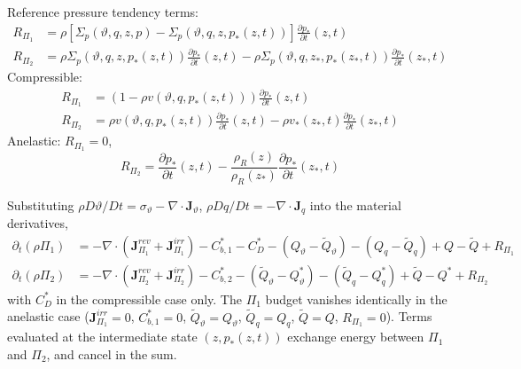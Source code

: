 \documentclass{article}
\begin{document}
Reference pressure tendency terms:
\begin{align}
    R_{\Pi_1}
    & =
    \rho
    \left[
        \Sigma_p(\vartheta, q, z, p)
        - \Sigma_p(\vartheta, q, z, p_*(z, t))
    \right]
    \frac{\partial p_*}{\partial t}(z, t)
    \\
    R_{\Pi_2}
    & =
    \rho \Sigma_p(\vartheta, q, z, p_*(z, t)) \frac{\partial p_*}{\partial t}(z, t)
    - \rho \Sigma_p(\vartheta, q, z_*, p_*(z_*, t)) \frac{\partial p_*}{\partial t}(z_*, t)
\end{align}
Compressible:
\begin{align}
    R_{\Pi_1}
    & =
    \left( 1 - \rho v(\vartheta, q, p_*(z, t)) \right) \frac{\partial p_*}{\partial t}(z, t)
    \\
    R_{\Pi_2}
    & =
    \rho v(\vartheta, q, p_*(z, t)) \frac{\partial p_*}{\partial t}(z, t)
    - \rho v_*(z_*, t) \frac{\partial p_*}{\partial t}(z_*, t)
\end{align}
Anelastic: \(R_{\Pi_1} = 0\),
\begin{equation}
    R_{\Pi_2}
    =
    \frac{\partial p_*}{\partial t}(z, t)
    - \frac{\rho_R(z)}{\rho_R(z_*)} \frac{\partial p_*}{\partial t}(z_*, t)
\end{equation}

Substituting \(\rho D\vartheta / Dt = \sigma_\vartheta - \nabla \cdot \mathbf{J}_\vartheta\), \(\rho D q / Dt = - \nabla \cdot \mathbf{J}_q\) into the material derivatives,
\begin{align}
    \partial_t (\rho \Pi_1)
    & =
    - \nabla \cdot (
        \mathbf{J}_{\Pi_1}^{rev}
        + \mathbf{J}_{\Pi_1}^{irr}
        )
    - C_{b,1}^*
    - C_D^*
    - (Q_\vartheta - \tilde{Q}_\vartheta)
    - (Q_q - \tilde{Q}_q)
    + Q - \tilde{Q}
    + R_{\Pi_1}
    \\
    \partial_t (\rho \Pi_2)
    & =
    - \nabla \cdot (
        \mathbf{J}_{\Pi_2}^{rev}
        + \mathbf{J}_{\Pi_2}^{irr}
        )
    - C_{b,2}^*
    - (\tilde{Q}_\vartheta - Q_\vartheta^*)
    - (\tilde{Q}_q - Q_q^*)
    + \tilde{Q} - Q^*
    + R_{\Pi_2}
\end{align}
with \(C_D^*\) in the compressible case only.
The \(\Pi_1\) budget vanishes identically in the anelastic case (\(\mathbf{J}_{\Pi_1}^{irr} = 0\), \(C_{b,1}^* = 0\), \(\tilde{Q}_\vartheta = Q_\vartheta\), \(\tilde{Q}_q = Q_q\), \(\tilde{Q} = Q\), \(R_{\Pi_1} = 0\)).
Terms evaluated at the intermediate state \((z, p_*(z, t))\) exchange energy between \(\Pi_1\) and \(\Pi_2\), and cancel in the sum.
\end{document}
